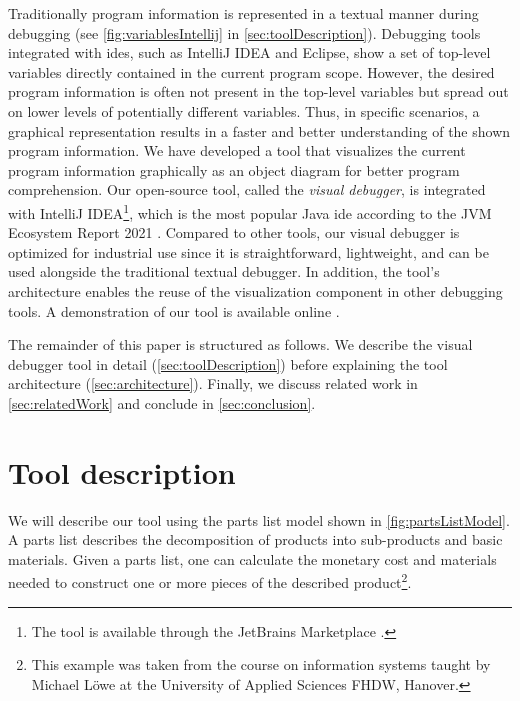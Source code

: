 \documentclass[conference]{IEEEtran}
\newcommand{\intellij}{IntelliJ IDEA}
\begin{document}
Traditionally program information is represented in a textual manner during debugging (see \autoref{fig:variablesIntellij} in \autoref{sec:toolDescription}).
Debugging tools integrated with \glspl*{ide}, such as \intellij{} and Eclipse, show a set of top-level variables directly contained in the current program scope.
However, the desired program information is often not present in the top-level variables but spread out on lower levels of potentially different variables.
Thus, in specific scenarios, a graphical representation results in a faster and better understanding of the shown program information.
We have developed a tool that visualizes the current program information graphically as an object diagram for better program comprehension.
Our open-source tool, called the \textit{visual debugger}, is integrated with \intellij{}\footnote{The tool is available through the JetBrains Marketplace \cite{VisualDebuggerIntelliJ}.}, which is the most popular Java \gls*{ide} according to the JVM Ecosystem Report 2021 \cite{JVMEcosystemReport2021}.
Compared to other tools, our visual debugger is optimized for industrial use since it is straightforward, lightweight, and can be used alongside the traditional textual debugger.
In addition, the tool's architecture enables the reuse of the visualization component in other debugging tools.
A demonstration of our tool is available online \cite{ArtifactsICSME2022}.

The remainder of this paper is structured as follows.
We describe the visual debugger tool in detail (\autoref{sec:toolDescription}) before explaining the tool architecture (\autoref{sec:architecture}).
Finally, we discuss related work in \autoref{sec:relatedWork} and conclude in \autoref{sec:conclusion}.

\section{Tool description} \label{sec:toolDescription}
We will describe our tool using the parts list model shown in \autoref{fig:partsListModel}.
A parts list describes the decomposition of products into sub-products and basic materials.
Given a parts list, one can calculate the monetary cost and materials needed to construct one or more pieces of the described product\footnote{This example was taken from the course on information systems taught by Michael Löwe at the University of Applied Sciences FHDW, Hanover.}.
\end{document}
